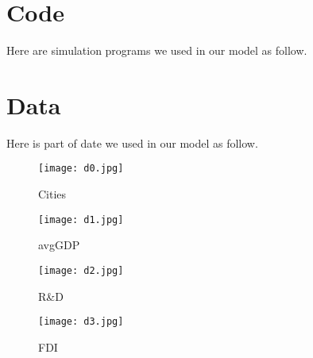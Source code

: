 \documentclass{mcmthesis}
\begin{document}
\begin{appendices}
\section{Code}
Here are simulation programs we used in our model as follow.\\
\indent







\section{Data}
Here is part of date we used in our model as follow.\\
\indent
\begin{figure}[htbp]
\small\centering
\texttt{[image: d0.jpg]}
\caption{Cities}
\end{figure}
\begin{figure}[htbp]
\small\centering
\texttt{[image: d1.jpg]}
\caption{avgGDP}
\end{figure}
\begin{figure}[htbp]
\small\centering
\texttt{[image: d2.jpg]}
\caption{R\&D}
\end{figure}
\begin{figure}[htbp]
\small\centering
\texttt{[image: d3.jpg]}
\caption{FDI}
\end{figure}
\end{appendices}
\end{document}
